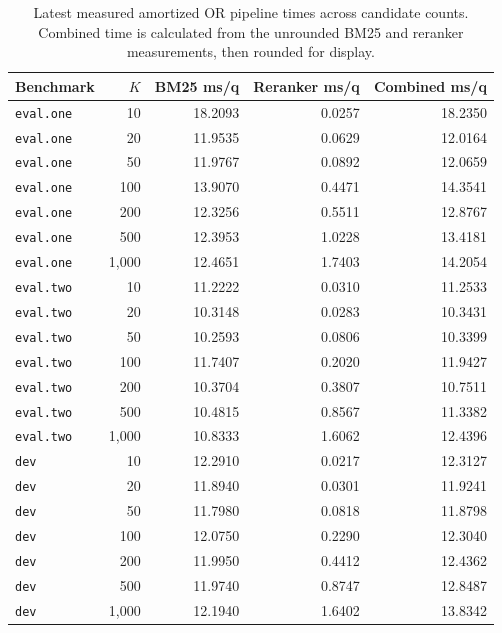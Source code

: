 \documentclass[11pt]{article}
\begin{document}
\begin{table}[H]
\centering
\small
\begin{tabular}{lrrrr}
\toprule
\textbf{Benchmark} & \textbf{$K$} & \textbf{BM25 ms/q} & \textbf{Reranker ms/q} & \textbf{Combined ms/q} \\
\midrule
\texttt{eval.one} & 10 & 18.2093 & 0.0257 & 18.2350 \\
\texttt{eval.one} & 20 & 11.9535 & 0.0629 & 12.0164 \\
\texttt{eval.one} & 50 & 11.9767 & 0.0892 & 12.0659 \\
\texttt{eval.one} & 100 & 13.9070 & 0.4471 & 14.3541 \\
\texttt{eval.one} & 200 & 12.3256 & 0.5511 & 12.8767 \\
\texttt{eval.one} & 500 & 12.3953 & 1.0228 & 13.4181 \\
\texttt{eval.one} & 1,000 & 12.4651 & 1.7403 & 14.2054 \\
\texttt{eval.two} & 10 & 11.2222 & 0.0310 & 11.2533 \\
\texttt{eval.two} & 20 & 10.3148 & 0.0283 & 10.3431 \\
\texttt{eval.two} & 50 & 10.2593 & 0.0806 & 10.3399 \\
\texttt{eval.two} & 100 & 11.7407 & 0.2020 & 11.9427 \\
\texttt{eval.two} & 200 & 10.3704 & 0.3807 & 10.7511 \\
\texttt{eval.two} & 500 & 10.4815 & 0.8567 & 11.3382 \\
\texttt{eval.two} & 1,000 & 10.8333 & 1.6062 & 12.4396 \\
\texttt{dev} & 10 & 12.2910 & 0.0217 & 12.3127 \\
\texttt{dev} & 20 & 11.8940 & 0.0301 & 11.9241 \\
\texttt{dev} & 50 & 11.7980 & 0.0818 & 11.8798 \\
\texttt{dev} & 100 & 12.0750 & 0.2290 & 12.3040 \\
\texttt{dev} & 200 & 11.9950 & 0.4412 & 12.4362 \\
\texttt{dev} & 500 & 11.9740 & 0.8747 & 12.8487 \\
\texttt{dev} & 1,000 & 12.1940 & 1.6402 & 13.8342 \\
\bottomrule
\end{tabular}
\caption{Latest measured amortized OR pipeline times across candidate counts. Combined time is calculated from the unrounded BM25 and reranker measurements, then rounded for display.}
\label{tab:timed_rerank}
\end{table}
\end{document}
